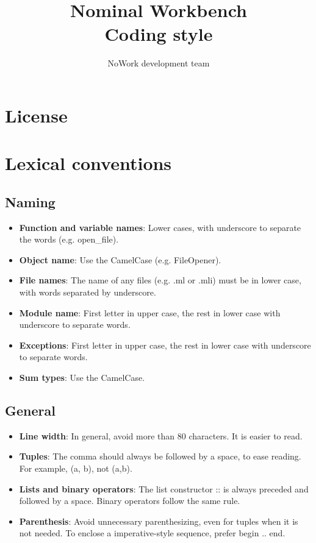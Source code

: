 \documentclass[12pt,a4paper]{article}
\title{Nominal Workbench \\
  Coding style}
\author{NoWork development team\\[2em]}
\begin{document}
\maketitle

\section{License}


\section{Lexical conventions}

\subsection{Naming}

\medskip

\begin{itemize}
\item \textbf{Function and variable names}: Lower cases, with underscore to 
  separate the words (e.g. open\_file).
\item \textbf{Object name}: Use the CamelCase (e.g. FileOpener).
\item \textbf{File names}: The name of any files (e.g. .ml or .mli) must be in
  lower case, with words separated by underscore.
\item \textbf{Module name}: First letter in upper case, the rest in lower case
  with underscore to separate words.
\item \textbf{Exceptions}: First letter in upper case, the rest in
  lower case with underscore to separate words.
\item \textbf{Sum types}: Use the CamelCase.
\end{itemize}

\subsection{General}

\medskip 

\begin{itemize}
\item \textbf{Line width}: In general, avoid more than 80 characters. It is
  easier to read.
\item \textbf{Tuples}: The comma should always be followed by a space, to ease
  reading. For example, \textsf{(a, b)}, not \textsf{(a,b)}.
\item \textbf{Lists and binary operators}: The list constructor \textsf{::} is
  always preceded and followed by a space. Binary operators follow the same
  rule.
\item \textbf{Parenthesis}: Avoid unnecessary parenthesizing, even for tuples when
  it is not needed. To enclose a imperative-style sequence, prefer \textsf{begin
    .. end}.
\end{itemize}
\end{document}
